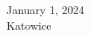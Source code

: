 {\begin{titlepage}
\begin{center}
            \vspace*{1.0 cm} 

            \vspace*{\fill} %
            
            \normalsize{
                January 1, 2024 \\
                Katowice
            }

        \end{center}
        
        \clearpage
    
    \end{titlepage}

    \restoregeometry
}


\maketitle
